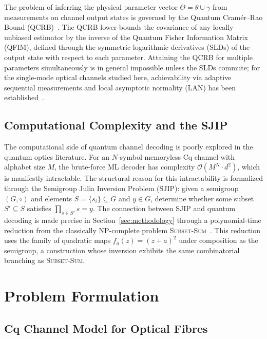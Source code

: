 \documentclass[journal,twocolumn]{IEEEtran}
\theoremstyle{definition}
\theoremstyle{plain}
\begin{document}
The problem of inferring the physical parameter vector
$\Theta = \theta \cup \gamma$ from measurements on channel output
states is governed by the Quantum Cram\'{e}r--Rao Bound
(QCRB)~\cite{helstrom1976,holevo2011,paris2009}.  The QCRB
lower-bounds the covariance of any locally unbiased estimator by the
inverse of the Quantum Fisher Information Matrix (QFIM), defined
through the symmetric logarithmic derivatives (SLDs) of the output
state with respect to each parameter.  Attaining the QCRB for
multiple parameters simultaneously is in general impossible unless
the SLDs commute; for the single-mode optical channels studied here,
achievability via adaptive sequential measurements and local
asymptotic normality (LAN) has been established~\cite{giovannetti2011}.

\subsection{Computational Complexity and the SJIP}

The computational side of quantum channel decoding is poorly
explored in the quantum optics literature.  For an $N$-symbol
memoryless Cq channel with alphabet size $M$, the brute-force ML
decoder has complexity $\mathcal{O}(M^N \cdot d^2)$, which is
manifestly intractable.  The structural reason for this intractability
is formalized through the Semigroup Julia Inversion Problem (SJIP):
given a semigroup $(G,\circ)$ and elements $S = \{s_i\} \subseteq G$
and $y \in G$, determine whether some subset $S' \subseteq S$
satisfies $\prod_{s \in S'} s = y$.  The connection between SJIP
and quantum decoding is made precise in Section~\ref{sec:methodology}
through a polynomial-time reduction from the classically NP-complete
problem \textsc{Subset-Sum}~\cite{garey1979}.  This reduction uses
the family of quadratic maps $f_a(z) = (z+a)^2$ under composition
as the semigroup, a construction whose inversion exhibits the same
combinatorial branching as \textsc{Subset-Sum}.

\section{Problem Formulation}
\label{sec:problem}

\subsection{Cq Channel Model for Optical Fibres}
\end{document}
